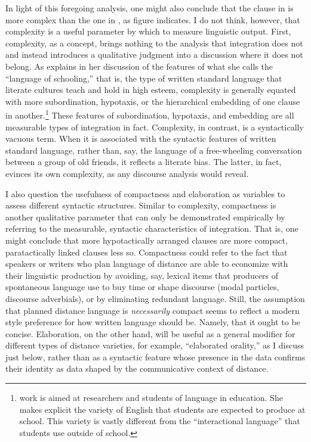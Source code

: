 In light of this foregoing analysis, one might also conclude that the clause in  is more complex than the one in , as  figure indicates. I do not think, however, that complexity is a useful parameter by which to measure linguistic output. First, complexity, as a concept, brings nothing to the analysis that integration does not and instead introduces a qualitative judgment into a discussion where it does not belong. As \citet[14]{Schleppegrell2004} explains in her discussion of the features of what she calls the “language of schooling,” that is, the type of written standard language that literate cultures teach and hold in high esteem, complexity is generally equated with more subordination, hypotaxis, or the hierarchical embedding of one clause in another.\footnote{ work is aimed at researchers and students of language in education. She makes explicit the variety of English that students are expected to produce at school. This variety is vastly different from the “interactional language” that students use outside of school.} These features of subordination, hypotaxis, and embedding are all measurable types of integration in fact. Complexity, in contrast, is a syntactically vacuous term. When it is associated with the syntactic features of written standard language, rather than, say, the language of a free-wheeling conversation between a group of old friends, it reflects a literate bias. The latter, in fact, evinces its own complexity, as any discourse analysis would reveal.

I also question the usefulness of compactness and elaboration as variables to assess different syntactic structures. Similar to complexity, compactness is another qualitative parameter that can only be demonstrated empirically by referring to the measurable, syntactic characteristics of integration. That is, one might conclude that more hypotactically arranged clauses are more compact, paratactically linked clauses less so. Compactness could refer to the fact that speakers or writers who plan language of distance are able to economize with their linguistic production by avoiding, say, lexical items that producers of spontaneous language use to buy time or shape discourse (modal particles, discourse adverbials), or by eliminating redundant language. Still, the assumption that planned distance language is \textit{necessarily} compact seems to reflect a modern style preference for how written language should be. Namely, that it ought to be concise. Elaboration, on the other hand, will be useful as a general modifier for different types of distance varieties, for example, “elaborated orality,” as I discuss just below, rather than as a syntactic feature whose presence in the data confirms their identity as data shaped by the communicative context of distance.

